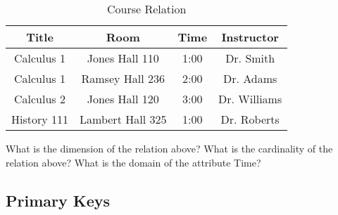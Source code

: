 \documentclass{article}
\begin{document}
 
\begin{table}[htdp]
\caption{Course Relation}
{\scriptsize
\begin{center}
\begin{tabular}{|c|c|c|c|}
  \hline
  \cellcolor{excel}\textsf{Title} & \cellcolor{excel}\textsf{Room}
& \cellcolor{excel}\textsf{Time} & \cellcolor{excel}\textsf{Instructor}  \\
  \hline
  Calculus 1 & Jones Hall 110   & 1:00  & Dr. Smith\\
    \hline
     Calculus 1 & Ramsey Hall 236   & 2:00  & Dr. Adams\\
    \hline
     Calculus 2 & Jones Hall 120   & 3:00  & Dr. Williams\\
    \hline
     History 111 & Lambert Hall 325   & 1:00  & Dr. Roberts\\
    \hline
\end{tabular}
\end{center}
}
\label{tab1}
\end{table}%






\begin{outline}[enumerate]
        \1 What is the dimension of the relation above?
        \1 What is the cardinality of the relation above?
        \1 What is the domain of the attribute Time?
\end{outline}

 
 
 \subsection{Primary Keys}
 
\end{document}

